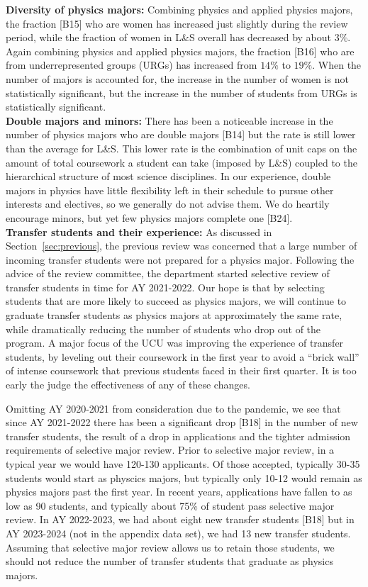 \documentclass[12pt]{article}
\begin{document}
\noindent
{\bf Diversity of physics majors:}
Combining physics and applied physics majors, the fraction [B15] who
are women has increased just slightly during the review period, while
the fraction of women in L\&S overall has decreased by about $3\%$.
Again combining physics and applied physics majors, the fraction [B16]
who are from underrepresented groups (URGs) has increased from $14\%$
to $19\%$.  When the number of majors is accounted for, the increase
in the number of women is not statistically significant, but the
increase in the number of students from URGs is statistically
significant.\\[3pt]

\noindent
{\bf Double majors and minors:} There has been a noticeable increase
in the number of physics majors who are double majors [B14] but the
rate is still lower than the average for L\&S.  This lower rate is the
combination of unit caps on the amount of total coursework a student
can take (imposed by L\&S) coupled to the hierarchical structure of
most science disciplines.  In our experience, double majors in physics
have little flexibility left in their schedule to pursue other
interests and electives, so we generally do not advise them.  We do
heartily encourage minors, but yet few physics majors complete one
[B24].\\[3pt]

\noindent
{\bf Transfer students and their experience:}
As discussed in Section~\ref{sec:previous}, the previous review was
concerned that a large number of incoming transfer students were not
prepared for a physics major.  Following the advice of the review
committee, the department started selective review of transfer
students in time for AY 2021-2022.  Our hope is that by selecting
students that are more likely to succeed as physics majors, we will
continue to graduate transfer students as physics majors at
approximately the same rate, while dramatically reducing the number of
students who drop out of the program.  A major focus of the UCU was
improving the experience of transfer students, by leveling out their
coursework in the first year to avoid a ``brick wall'' of intense
coursework that previous students faced in their first quarter.  It is
too early the judge the effectiveness of any of these changes.

Omitting AY 2020-2021 from consideration due to the pandemic, we see
that since AY 2021-2022 there has been a significant drop [B18] in the
number of new transfer students, the result of a drop in applications
and the tighter admission requirements of selective major review.
Prior to selective major review, in a typical year we would have
120-130 applicants.  Of those accepted, typically 30-35 students would
start as physcics majors, but typically only 10-12 would remain as
physics majors past the first year.  In recent years, applications
have fallen to as low as 90 students, and typically about 75\% of
student pass selective major review.  In AY 2022-2023, we had about
eight new transfer students [B18] but in AY 2023-2024 (not in the
appendix data set), we had 13 new transfer students.  Assuming that
selective major review allows us to retain those students, we should
not reduce the number of transfer students that graduate as physics
majors.
\end{document}
